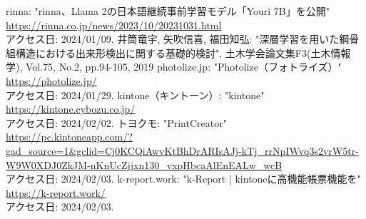 \documentclass[uplatex, report, a4j, 10pt]{jsbook}
\begin{document}
\begin{thebibliography}{0}
  rinna: "rinna、Llama 2の日本語継続事前学習モデル「Youri 7B」を公開"\\\url{https://rinna.co.jp/news/2023/10/20231031.html}\\アクセス日: 2024/01/09.
  井筒竜宇, 矢吹信喜, 福田知弘: "深層学習を用いた鋼骨組構造における出来形検出に関する基礎的検討", 土木学会論文集F3(土木情報学), Vol.75, No.2, pp.94-105, 2019
  photolize.jp: "Photolize（フォトライズ）"\\\url{https://photolize.jp/}\\アクセス日: 2024/01/29.
  kintone（キントーン）: "kintone"\\\url{https://kintone.cybozu.co.jp/}\\アクセス日: 2024/02/02.
  トヨクモ: "PrintCreator"\\\url{https://pc.kintoneapp.com/?gad_source=1&gclid=Cj0KCQiAwvKtBhDrARIsAJj-kTj_rrNpIWvq3s2vrW5tr-W9W0XDJ0ZkJM-nKnUcZjjxn130_vxpHbcaAlEnEALw_wcB}\\アクセス日: 2024/02/03.
  k-report.work: "k-Report | kintoneに高機能帳票機能を"\\\url{https://k-report.work/}\\アクセス日: 2024/02/03.
\end{thebibliography}

\end{document}
